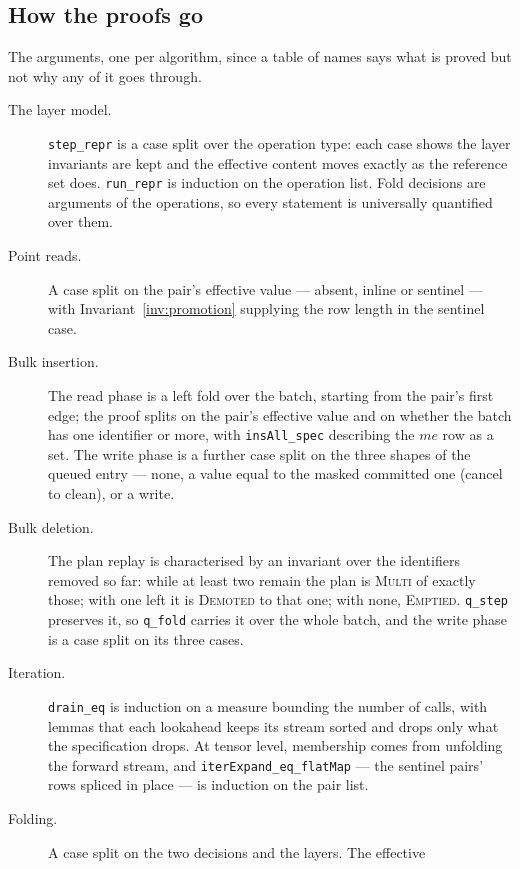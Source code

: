 \documentclass[11pt,a4paper]{article}
\theoremstyle{plain}
\theoremstyle{definition}
\theoremstyle{remark}
\begin{document}
\subsection{How the proofs go}
\label{sec:howproved}

The arguments, one per algorithm, since a table of names says what is proved but
not why any of it goes through.

\begin{description}
\item[The layer model.] \texttt{step\_repr} is a case split over the operation
  type: each case shows the layer invariants are kept and the effective content
  moves exactly as the reference set does. \texttt{run\_repr} is induction on the
  operation list. Fold decisions are arguments of the operations, so every
  statement is universally quantified over them.
\item[Point reads.] A case split on the pair's effective value --- absent,
  inline or sentinel --- with Invariant~\ref{inv:promotion} supplying the row
  length in the sentinel case.
\item[Bulk insertion.] The read phase is a left fold over the batch, starting
  from the pair's first edge; the proof splits on the pair's effective value and
  on whether the batch has one identifier or more, with \texttt{insAll\_spec}
  describing the $me$ row as a set. The write phase is a further case split on
  the three shapes of the queued entry --- none, a value equal to the masked
  committed one (cancel to clean), or a write.
\item[Bulk deletion.] The plan replay is characterised by an invariant over the
  identifiers removed so far: while at least two remain the plan is
  \textsc{Multi} of exactly those; with one left it is \textsc{Demoted} to that
  one; with none, \textsc{Emptied}. \texttt{q\_step} preserves it, so
  \texttt{q\_fold} carries it over the whole batch, and the write phase is a case
  split on its three cases.
\item[Iteration.] \texttt{drain\_eq} is induction on a measure bounding the
  number of calls, with lemmas that each lookahead keeps its stream sorted and
  drops only what the specification drops. At tensor level, membership comes from
  unfolding the forward stream, and \texttt{iterExpand\_eq\_flatMap} --- the
  sentinel pairs' rows spliced in place --- is induction on the pair list.
\item[Folding.] A case split on the two decisions and the layers. The effective

\end{description}
\end{document}
